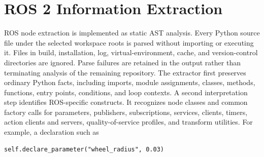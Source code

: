 \section{ROS 2 Information Extraction}
ROS node extraction is implemented as static AST analysis. Every Python source file under the selected workspace roots is parsed without importing or executing it. Files in build, installation, log, virtual-environment, cache, and version-control directories are ignored. Parse failures are retained in the output rather than terminating analysis of the remaining repository.
The extractor first preserves ordinary Python facts, including imports, module assignments, classes, methods, functions, entry points, conditions, and loop contexts. A second interpretation step identifies ROS-specific constructs. It recognizes node classes and common factory calls for parameters, publishers, subscriptions, services, clients, timers, action clients and servers, quality-of-service profiles, and transform utilities. For example, a declaration such as

\begin{verbatim}
self.declare_parameter("wheel_radius", 0.03)
\end{verbatim}

